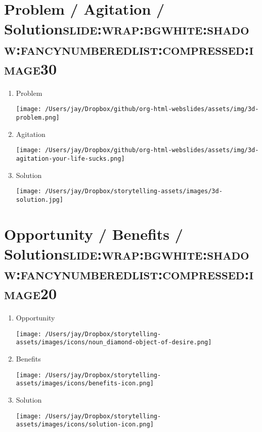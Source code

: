 \documentclass[12pt]{article}
\begin{document}
\section[Problem / Agitation / Solution]{Problem / Agitation / Solution\hfill{}\textsc{slide:wrap:bgwhite:shadow:fancynumberedlist:compressed:image30}}
\label{sec:org8fba461}
\begin{enumerate}
\item Problem \begin{center}
\texttt{[image: /Users/jay/Dropbox/github/org-html-webslides/assets/img/3d-problem.png]}
\end{center}
\item Agitation \begin{center}
\texttt{[image: /Users/jay/Dropbox/github/org-html-webslides/assets/img/3d-agitation-your-life-sucks.png]}
\end{center}
\item Solution \begin{center}
\texttt{[image: /Users/jay/Dropbox/storytelling-assets/images/3d-solution.jpg]}
\end{center}
\end{enumerate}


\section[Opportunity / Benefits / Solution]{Opportunity / Benefits / Solution\hfill{}\textsc{slide:wrap:bgwhite:shadow:fancynumberedlist:compressed:image20}}
\label{sec:org6e09de5}
\begin{enumerate}
\item Opportunity \begin{center}
\texttt{[image: /Users/jay/Dropbox/storytelling-assets/images/icons/noun\_diamond-object-of-desire.png]}
\end{center}
\item Benefits \begin{center}
\texttt{[image: /Users/jay/Dropbox/storytelling-assets/images/icons/benefits-icon.png]}
\end{center}
\item Solution \begin{center}
\texttt{[image: /Users/jay/Dropbox/storytelling-assets/images/icons/solution-icon.png]}
\end{center}
\end{enumerate}
\end{document}
